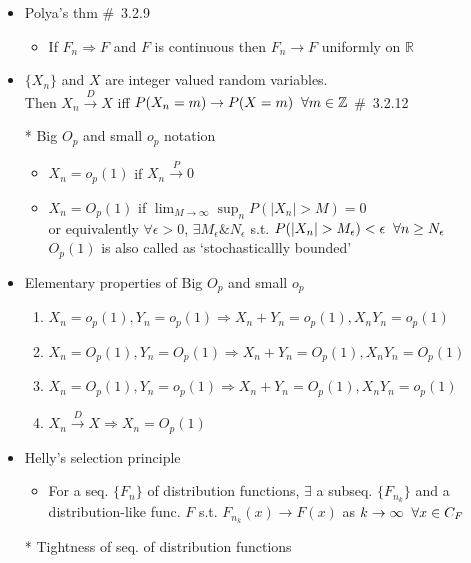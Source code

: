 \documentclass[12pt, A4]{article}
\begin{document}
\begin{itemize}
	\item Polya's thm \quad \#\ 3.2.9
	\begin{itemize}
		\item If $F_n\Rightarrow F$ and $F$ is continuous then $F_n\rightarrow F$ uniformly on $\mathbb{R}$
	\end{itemize}
	\item $\{X_n\}$ and $X$ are integer valued random variables. \\ Then $X_n\xrightarrow{D}X$ iff $P(X_n=m)\rightarrow P(X=m) \hspace{0.2cm} \forall m\in\mathbb{Z}$ \quad \#\ 3.2.12
	\item[*] Big $O_p$ and small $o_p$ notation
	\begin{itemize}
		\item $X_n=o_p(1)$ if $X_n\xrightarrow{P} 0$
		\item $X_n=O_p(1)$ if $\lim_{M \to \infty}\sup_{n}P(|X_n|>M)=0$
		\\ or equivalently $\forall \epsilon>0$, $\exists M_\epsilon \& N_\epsilon$ s.t. $P(|X_n|>M_\epsilon)<\epsilon \hspace{0.2cm} \forall n\geq N_\epsilon$
		\\$O_p(1)$ is also called as `stochasticallly bounded'
	\end{itemize}
	\item Elementary properties of Big $O_p$ and small $o_p$
	\begin{enumerate}
		\item $X_n=o_p(1), Y_n=o_p(1) \Rightarrow X_n+Y_n=o_p(1), X_nY_n=o_p(1)$
		\item $X_n=O_p(1), Y_n=O_p(1) \Rightarrow X_n+Y_n=O_p(1), X_nY_n=O_p(1)$
		\item $X_n=O_p(1), Y_n=o_p(1) \Rightarrow X_n+Y_n=O_p(1), X_nY_n=o_p(1)$
		\item $X_n\xrightarrow{D} X \Rightarrow X_n=O_p(1)$
	\end{enumerate}
\clearpage
	\item Helly's selection principle
	\begin{itemize}
		\item For a seq. $\{F_n\}$ of distribution functions, $\exists$ a subseq. $\{F_{n_k}\}$ and a distribution-like func. $F$ s.t. $F_{n_k}(x)\rightarrow F(x)$ as $k\rightarrow \infty \hspace{0.2cm} \forall x \in C_F$
	\end{itemize}
	\item[*] Tightness of seq. of distribution functions
	\begin{itemize}

\end{itemize}
\end{itemize}
\end{document}
